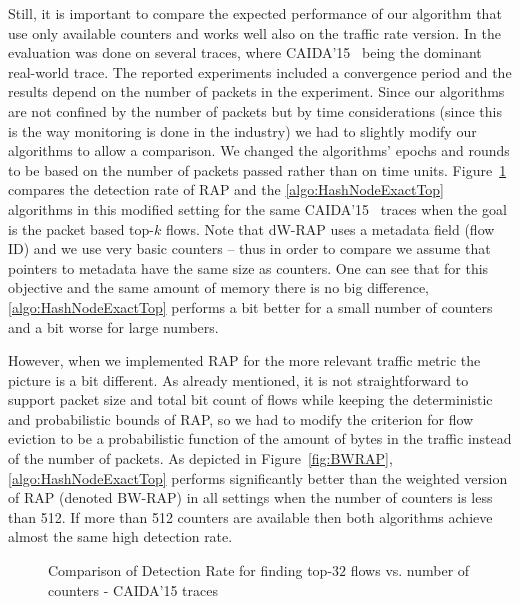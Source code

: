 Still, it is important to compare the expected performance of our algorithm that use only available counters and works well also on the traffic rate version. In \cite{Ben-Basat2017} the evaluation was done on several traces, where CAIDA’15~\cite{CAIDA15} being the dominant real-world trace. The reported experiments included a convergence period and the results depend on the number of packets in the experiment. Since our algorithms are not confined by the number of packets but by time considerations (since this is the way monitoring is done in the industry) we had to slightly modify our algorithms to allow a comparison. We changed the algorithms’ epochs and rounds to be based on the number of packets passed rather than on time units. Figure~\ref{fig:RAP} compares the detection rate of RAP and the \ref{algo:HashNodeExactTop} algorithms in this modified setting for the same CAIDA’15~\cite{CAIDA15} traces when the goal is the packet based top-$k$ flows. Note that dW-RAP uses a metadata field (flow ID) and we use very basic counters – thus in order to compare we assume that pointers to metadata have the same size as counters. One can see that for this objective and the same amount of memory there is no big difference, \ref{algo:HashNodeExactTop} performs a bit better for a small number of counters and a bit worse for large numbers. 

However, when we implemented RAP for the more relevant traffic metric the picture is a bit different.  As already mentioned, it is not straightforward to support packet size and total bit count of flows while keeping the deterministic and probabilistic bounds of RAP, so we had to modify the criterion for flow eviction to be a probabilistic function of the amount of bytes in the traffic instead of the number of packets. As depicted in Figure~\ref{fig:BWRAP}, \ref{algo:HashNodeExactTop} performs significantly better than the weighted version of RAP (denoted BW-RAP) in all settings when the number of counters is less than 512. If more than 512 counters are available then both algorithms achieve almost the same high detection rate. 

\begin{figure}
    \centering
    \caption{Comparison of Detection Rate for finding top-$32$ flows vs. number of counters - CAIDA'15 traces}
    \label{fig:RAP}

\end{figure}

